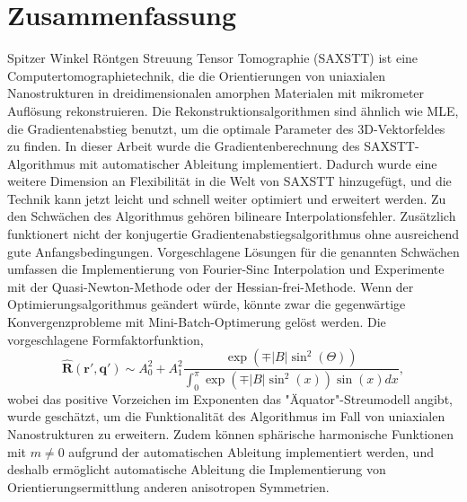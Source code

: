 \pagebreak
\chapter*{Zusammenfassung}
Spitzer Winkel Röntgen Streuung Tensor Tomographie (SAXSTT) ist eine Computertomographietechnik,
die die Orientierungen von uniaxialen Nanostrukturen in dreidimensionalen amorphen Materialen mit mikrometer Auflösung rekonstruieren.
Die Rekonstruktionsalgorithmen sind ähnlich wie MLE, die Gradientenabstieg benutzt, um die optimale Parameter des 3D-Vektorfeldes zu finden.
In dieser Arbeit wurde die Gradientenberechnung des SAXSTT-Algorithmus mit automatischer Ableitung implementiert.
Dadurch wurde eine weitere Dimension an Flexibilität in die Welt von SAXSTT hinzugefügt, und die Technik kann jetzt leicht und schnell weiter optimiert und erweitert werden.
Zu den Schwächen des Algorithmus gehören bilineare Interpolationsfehler.
Zusätzlich funktionert nicht der konjugertie Gradientenabstiegsalgorithmus ohne ausreichend gute Anfangsbedingungen.
Vorgeschlagene Lösungen für die genannten Schwächen umfassen die Implementierung von Fourier-Sinc Interpolation und Experimente mit der Quasi-Newton-Methode oder der Hessian-frei-Methode.
Wenn der Optimierungsalgorithmus geändert würde, könnte zwar die gegenwärtige Konvergenzprobleme mit Mini-Batch-Optimerung gelöst werden.
Die vorgeschlagene Formfaktorfunktion,
\begin{equation*}
    \bm{\widehat{R}}(\bm{r'}, \bm{q'}) \sim A_{0}^{2} + A_{1}^{2}\frac{ \exp\left(\mp |B| \sin^2(\Theta) \right) } {\int_{0}^{\pi} \exp\left( \mp |B| \sin^{2}(x) \right) \sin(x) dx},
\end{equation*}
wobei das positive Vorzeichen im Exponenten das "Äquator"-Streumodell angibt, wurde geschätzt, um die Funktionalität des Algorithmus im Fall von uniaxialen Nanostrukturen zu erweitern.
Zudem können sphärische harmonische Funktionen mit $m \neq 0$ aufgrund der automatischen Ableitung implementiert werden,
und deshalb ermöglicht automatische Ableitung die Implementierung von Orientierungsermittlung anderen anisotropen Symmetrien.


\endgroup

\vfill

